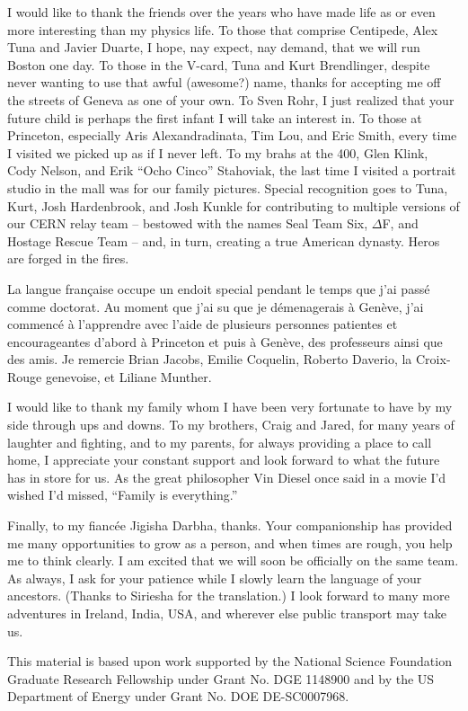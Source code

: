 I would like to thank the friends over the years who have made life as or even more interesting
than my physics life. 
To those that comprise Centipede, Alex Tuna and Javier Duarte, I hope, nay expect, nay demand,
that we will run Boston one day.
To those in the V-card, Tuna and Kurt Brendlinger,
despite never wanting to use that awful (awesome?) name,
thanks for accepting me off the streets of Geneva as one of your own.
To Sven Rohr, I just realized that your future child is perhaps the first infant
I will take an interest in.
To those at Princeton, especially Aris Alexandradinata, Tim Lou, and Eric Smith,
every time I visited we picked up as if I never left.
To my brahs at the 400, Glen Klink, Cody Nelson, and Erik ``Ocho Cinco'' Stahoviak,
the last time I visited a portrait studio in the mall was for our family pictures.
Special recognition goes to Tuna, Kurt, Josh Hardenbrook, and Josh Kunkle for contributing
to multiple versions of our CERN relay team -- bestowed with the names Seal Team Six, $\Delta$F,
and Hostage Rescue Team -- and, in turn, creating a true American dynasty.
Heros are forged in the fires.

La langue française occupe un endoit special pendant le temps que j'ai passé comme doctorat.
Au moment que j'ai su que je démenagerais à Genève, j'ai commencé à l'apprendre avec l'aide de
plusieurs personnes patientes et encourageantes d'abord à Princeton et puis à Genève,
des professeurs ainsi que des amis.
Je remercie Brian Jacobs, Emilie Coquelin, Roberto Daverio, la Croix-Rouge genevoise,
et Liliane Munther.

I would like to thank my family whom I have been very fortunate to have by my side through ups and
downs. To my brothers, Craig and Jared, for many years of laughter and fighting, and
to my parents, for always providing a place to call home, I appreciate your constant support
and look forward to what the future has in store for us.
As the great philosopher Vin Diesel once said in a movie I'd wished I'd missed,
``Family is everything.''

Finally, to my fiancée Jigisha Darbha, thanks.
Your companionship has provided me many opportunities to grow as a person, and
when times are rough, you help me to think clearly.
I am excited that we will soon be officially on the same team.
As always, I ask for your patience while I slowly learn the language of your ancestors.
(Thanks to Siriesha for the translation.)
I look forward to many more adventures in Ireland, India, USA, and wherever else
public transport may take us.


This material is based upon work supported by the National Science Foundation
Graduate Research Fellowship under Grant No. DGE 1148900
and by the US Department of Energy under Grant No. DOE DE-SC0007968.
